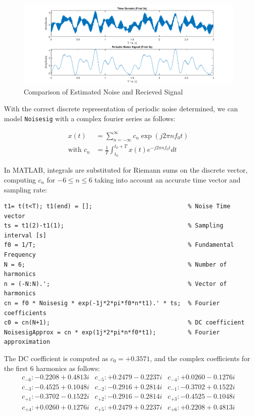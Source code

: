 \documentclass[12pt]{article}
\begin{document}
\begin{figure}[ht]
    \centering
    \includegraphics{figures/p2-noisecomp.png}
    \caption{Comparison of Estimated Noise and Recieved Signal\label{fig:p2-noisecomp}}
\end{figure}

With the correct discrete representation of periodic noise determined, we can
model \verb+Noisesig+ with a complex fourier series as follows:

\begin{align*}
    x(t)             & = \sum_{n=-\infty}^{\infty} c_n \exp(j 2\pi n f_0 t)        \\
    \text{with } c_n & = \frac{1}{T} \int^{t_0 + T}_{t_0} x(t)e^{-j2\pi nf_0 t} dt
\end{align*}

In MATLAB, integrals are substituted for Riemann sums on the discrete vector,
computing $c_n$ for $-6\le n \le 6$ taking into account an accurate time vector
and sampling rate:

\begin{verbatim}
t1= t(t<T); t1(end) = [];                           % Noise Time vector 
ts = t1(2)-t1(1);                                   % Sampling interval [s]
f0 = 1/T;                                           % Fundamental Frequency
N = 6;                                              % Number of harmonics
n = (-N:N).';                                       % Vector of harmonics
cn = f0 * Noisesig * exp(-1j*2*pi*f0*n*t1).' * ts;  % Fourier coefficients
c0 = cn(N+1);                                       % DC coefficient
NoisesigApprox = cn * exp(1j*2*pi*n*f0*t1);         % Fourier approximation
\end{verbatim}

The DC coefficient is computed as $c_0 = +0.3571$, and the complex coefficients
for the first 6 harmonics as follows:
\[
    \begin{array}{ccc}
        c_{-6} : -0.2208 + 0.4813i & c_{-5} : +0.2479 - 0.2237i & c_{-4} : +0.0260 - 0.1276i \\
        c_{-3} : -0.4525 + 0.1048i & c_{-2} : -0.2916 + 0.2814i & c_{-1} : -0.3702 + 0.1522i \\
        c_{+1} : -0.3702 - 0.1522i & c_{+2} : -0.2916 - 0.2814i & c_{+3} : -0.4525 - 0.1048i \\
        c_{+4} : +0.0260 + 0.1276i & c_{+5} : +0.2479 + 0.2237i & c_{+6} : +0.2208 + 0.4813i \\
    \end{array}
\]
\end{document}
